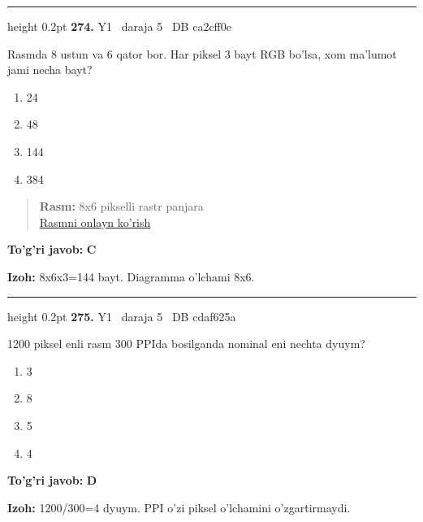 \documentclass[10pt,a4paper,oneside]{article}
\begin{document}
\vspace{2mm}\hrule height 0.2pt \vspace{4mm}
\hypertarget{q274}{\textbf{\color{ink}274.}}  {\color{muted}\scriptsize Y1 \textbullet\ daraja 5 \textbullet\ DB ca2cff0e}
\par
Rasmda 8 ustun va 6 qator bor. Har piksel 3 bayt RGB bo'lsa, xom ma'lumot jami necha bayt?
\begin{enumerate}[label=\Alph*),leftmargin=9mm]
\item 24
\item 48
\item 144
\item 384
\end{enumerate}
\begin{quote}\footnotesize\color{muted}\textbf{Rasm:} 8x6 pikselli rastr panjara\\
\href{https://github.com/sarvar9417/attestatsiya/blob/main/public/graphics-web-v2/raster_grid.svg}{Rasmni onlayn ko'rish}
\end{quote}
\begin{tcolorbox}[enhanced,breakable,colback=teal!4,colframe=teal!45!black,boxrule=0.45pt,arc=1.2mm,left=2.8mm,right=2.8mm,top=2mm,bottom=2mm,before skip=2mm,after skip=2mm]
\textbf{\color{teal}To'g'ri javob:} \textbf{C}
\par\smallskip
\textbf{Izoh:} 8x6x3=144 bayt. Diagramma o'lchami 8x6.
\end{tcolorbox}
\vspace{2mm}\hrule height 0.2pt \vspace{4mm}
\hypertarget{q275}{\textbf{\color{ink}275.}}  {\color{muted}\scriptsize Y1 \textbullet\ daraja 5 \textbullet\ DB cdaf625a}
\par
1200 piksel enli rasm 300 PPIda bosilganda nominal eni nechta dyuym?
\begin{enumerate}[label=\Alph*),leftmargin=9mm]
\item 3
\item 8
\item 5
\item 4
\end{enumerate}
\begin{tcolorbox}[enhanced,breakable,colback=teal!4,colframe=teal!45!black,boxrule=0.45pt,arc=1.2mm,left=2.8mm,right=2.8mm,top=2mm,bottom=2mm,before skip=2mm,after skip=2mm]
\textbf{\color{teal}To'g'ri javob:} \textbf{D}
\par\smallskip
\textbf{Izoh:} 1200/300=4 dyuym. PPI o'zi piksel o'lchamini o'zgartirmaydi.
\end{tcolorbox}
\end{document}
